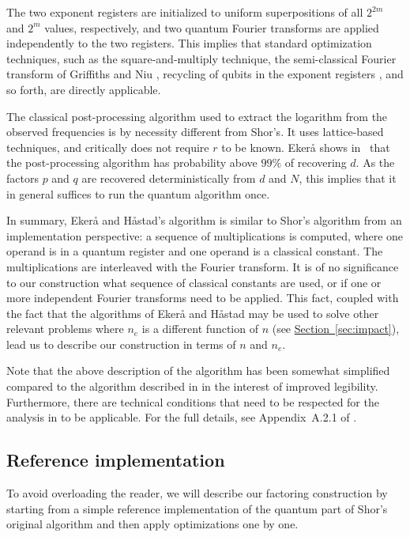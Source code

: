 \documentclass[superscriptaddress,notitlepage,longbibliography]{revtex4-1}
\theoremstyle{definition}
\theoremstyle{definition}
\renewcommand{\sec}[1]{\hyperref[sec:#1]{Section~\ref*{sec:#1}}}
\begin{document}
The two exponent registers are initialized to uniform superpositions of all $2^{2m}$ and $2^{m}$ values, respectively, and two quantum Fourier transforms are applied independently to the two registers.
This implies that standard optimization techniques, such as the square-and-multiply technique, the semi-classical Fourier transform of Griffiths and Niu \cite{griffiths1996semiclassical}, recycling of qubits in the exponent registers \cite{mosca1999recycle, parker2000recycle}, and so forth, are directly applicable.

The classical post-processing algorithm used to extract the logarithm from the observed frequencies is by necessity different from Shor's.
It uses lattice-based techniques, and critically does not require $r$ to be known.
Ekerå shows in~\cite{ekeraa2017pp} that the post-processing algorithm has probability above $99\%$ of recovering $d$.
As the factors $p$ and $q$ are recovered deterministically from $d$ and $N$, this implies that it in general suffices to run the quantum algorithm once.

In summary, Ekerå and Håstad's algorithm is similar to Shor's algorithm from an implementation perspective:
a sequence of multiplications is computed, where one operand is in a quantum register and one operand is a classical constant.
The multiplications are interleaved with the Fourier transform.
It is of no significance to our construction what sequence of classical constants are used, or if one or more independent Fourier transforms need to be applied.
This fact, coupled with the fact that the algorithms of Ekerå and Håstad may be used to solve other relevant problems where $n_e$ is a different function of $n$ (see \sec{impact}), lead us to describe our construction in terms of $n$ and $n_e$.

Note that the above description of the algorithm has been somewhat simplified compared to the algorithm described in \cite{ekeraa2017quantum, ekeraa2017pp} in the interest of improved legibility.
Furthermore, there are technical conditions that need to be respected for the analysis in \cite{ekeraa2017pp} to be applicable.
For the full details, see Appendix~A.2.1 of \cite{ekeraa2017pp}.

\subsection{Reference implementation}

To avoid overloading the reader, we will describe our factoring construction by starting from a simple reference implementation of the quantum part of Shor's original algorithm and then apply optimizations one by one.
\end{document}
